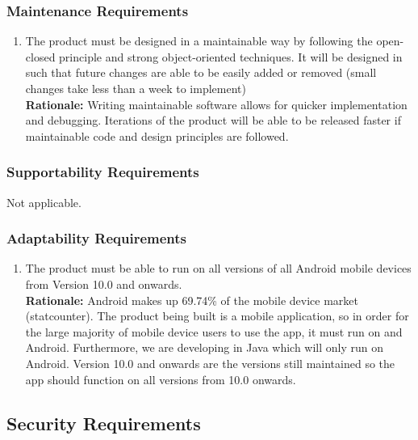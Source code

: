 \documentclass[]{article}
\begin{document}
\subsubsection{Maintenance Requirements}
\label{ssub:maintenance_requirements}
\begin{enumerate}[{MS-M}1. ]
	\item The product must be designed in a maintainable way by following the open-closed principle and strong object-oriented techniques. It will be designed in such that future changes are able to be easily added or removed (small changes take less than a week to implement) \\
	{\bf Rationale:} Writing maintainable software allows for quicker implementation and debugging. Iterations of the product will be able to be released faster if maintainable code and design principles are followed.
\end{enumerate}

\subsubsection{Supportability Requirements}
\label{ssub:supportability_requirements}
Not applicable.

\subsubsection{Adaptability Requirements}
\label{ssub:adaptability_requirements}
\begin{enumerate}[{MS-A}1. ]
	\item The product must be able to run on all versions of all Android mobile devices from Version 10.0 and onwards. \\
	{\bf Rationale:} Android makes up 69.74\% of the mobile device market (statcounter). The product being built is a mobile application, so in order for the large majority of mobile device users to use the app, it must run on and Android. Furthermore, we are developing in Java which will only run on Android. Version 10.0 and onwards are the versions still maintained so the app should function on all versions from 10.0 onwards.
\end{enumerate}


\subsection{Security Requirements}
\label{sub:security_requirements}
\end{document}
